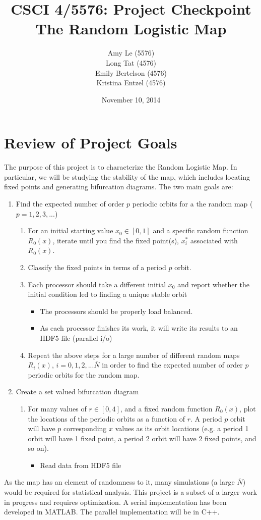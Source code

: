 \documentclass[12pt]{article}
\newcommand{\be}{\begin{enumerate}}
\newcommand{\ee}{\end{enumerate}}
\newcommand{\bi}{\begin{itemize}}
\newcommand{\ei}{\end{itemize}}
\begin{document}
\pagestyle{plain} %
\title{CSCI 4/5576: Project Checkpoint \\ The Random Logistic Map}
\date{November 10, 2014}
\author{Amy Le (5576)\\Long Tat (4576)\\Emily Bertelson (4576)\\Kristina Entzel (4576)}
\maketitle
\section{Review of Project Goals}
The purpose of this project is to characterize the Random Logistic
Map. In particular, we will be studying the stability of the map,
which includes locating fixed points and generating bifurcation
diagrams. The two main goals are:
\be
\item Find the expected number of order $p$ periodic orbits for a
  the random map ($p = 1, 2, 3, ...$)
\be
\item For an initial starting value $x_0 \in [0,1]$ and a specific
  random function $R_0(x)$, iterate until you
  find the fixed point(s), $x_i^*$ associated with $R_0(x)$. 
\item Classify the fixed points in terms of a period $p$ orbit. 
\item Each processor should take a different initial $x_0$ and report
  whether the initial condition led to finding a unique stable orbit  
\bi
\item The processors should be properly load balanced.
\item As each processor finishes its work, it will write its results
  to an HDF5 file (parallel i/o)
\ei
\item Repeat the above steps for a large number of different random
  maps $R_i(x)$, $i = 0, 1, 2,... \bar{N}$ in order to find the expected
  number of order $p$ periodic orbits for the random map.
\ee
\item Create a set valued bifurcation diagram \cite{lamb}
\be
\item For many values of $r \in [0,4]
$, and a fixed random function
  $R_0(x)$, plot the locations of the periodic orbits as a function of
  $r$. A period $p$ orbit will have $p$ corresponding $x$ values as
  its orbit locations (e.g. a period 1 orbit will have 1 fixed point,
  a period 2 orbit will have 2 fixed points, and so on). 
\bi
\item Read data from HDF5 file
\ei
\ee
\ee
As the map has an element of randomness to it, many
simulations (a large $\bar{N}$) would be required for statistical analysis. This project is a subset of a larger work in progress
and requires optimization. A serial implementation has been developed
in MATLAB. The parallel implementation will be in C++.
\end{document}
